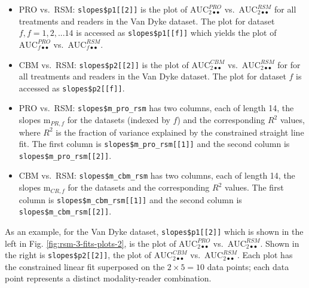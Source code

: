 \documentclass[
]{book}
\providecommand{\tightlist}{%
  \setlength{\itemsep}{0pt}\setlength{\parskip}{0pt}}
\begin{document}
\begin{itemize}
\tightlist
\item
  PRO vs.~RSM: \texttt{slopes\$p1{[}{[}2{]}{]}} is the plot of \(\text{AUC}^{PRO}_{2 \bullet \bullet}\) vs.~\(\text{AUC}^{RSM}_{2 \bullet \bullet}\) for all treatments and readers in the Van Dyke dataset. The plot for dataset \(f, f = 1, 2, ...14\) is accessed as \texttt{slopes\$p1{[}{[}f{]}{]}} which yields the plot of \(\text{AUC}^{PRO}_{f \bullet \bullet}\) vs.~\(\text{AUC}^{RSM}_{f \bullet \bullet}\).
\item
  CBM vs.~RSM: \texttt{slopes\$p2{[}{[}2{]}{]}} is the plot of \(\text{AUC}^{CBM}_{2 \bullet \bullet}\) vs.~\(\text{AUC}^{RSM}_{2 \bullet \bullet}\) for for all treatments and readers in the Van Dyke dataset. The plot for dataset \(f\) is accessed as \texttt{slopes\$p2{[}{[}f{]}{]}}.
\item
  PRO vs.~RSM: \texttt{slopes\$m\_pro\_rsm} has two columns, each of length 14, the slopes \(\text{m}_{PR,f}\) for the datasets (indexed by \(f\)) and the corresponding \(R^2\) values, where \(R^2\) is the fraction of variance explained by the constrained straight line fit. The first column is \texttt{slopes\$m\_pro\_rsm{[}{[}1{]}{]}} and the second column is \texttt{slopes\$m\_pro\_rsm{[}{[}2{]}{]}}.
\item
  CBM vs.~RSM: \texttt{slopes\$m\_cbm\_rsm} has two columns, each of length 14, the slopes \(\text{m}_{CR,f}\) for the datasets and the corresponding \(R^2\) values. The first column is \texttt{slopes\$m\_cbm\_rsm{[}{[}1{]}{]}} and the second column is \texttt{slopes\$m\_cbm\_rsm{[}{[}2{]}{]}}.
\end{itemize}

As an example, for the Van Dyke dataset, \texttt{slopes\$p1{[}{[}2{]}{]}} which is shown in the left in Fig. \ref{fig:rsm-3-fits-plots-2}, is the plot of \(\text{AUC}^{PRO}_{2 \bullet \bullet}\) vs.~\(\text{AUC}^{RSM}_{2 \bullet \bullet}\). Shown in the right is \texttt{slopes\$p2{[}{[}2{]}{]}}, the plot of \(\text{AUC}^{CBM}_{2 \bullet \bullet}\) vs.~\(\text{AUC}^{RSM}_{2 \bullet \bullet}\). Each plot has the constrained linear fit superposed on the \(2\times5 = 10\) data points; each data point represents a distinct modality-reader combination.
\end{document}
